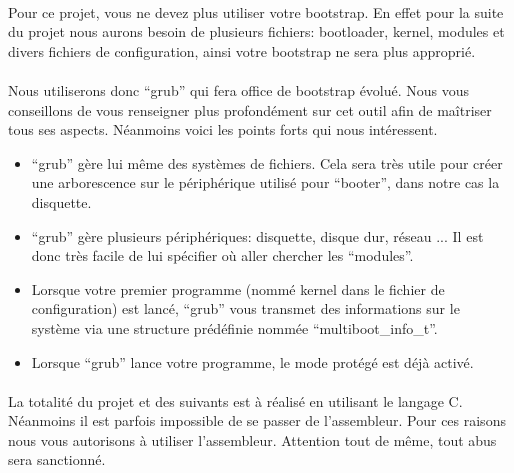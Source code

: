 \documentclass[10pt,a4wide]{article}
\begin{document}
\paragraph{}

Pour ce projet, vous ne devez plus utiliser votre bootstrap. En effet pour
la suite du projet nous aurons besoin de plusieurs fichiers: bootloader,
kernel, modules et divers fichiers de configuration, ainsi votre bootstrap
ne sera plus appropri\'e.

\paragraph{}

Nous utiliserons donc ``grub'' qui fera office de bootstrap \'evolu\'e. Nous
vous conseillons de vous renseigner plus profond\'ement sur cet outil
afin de ma\^itriser tous ses aspects. N\'eanmoins voici les points forts
qui nous int\'eressent.

\begin{itemize}

\item ``grub'' g\`ere lui m\^eme des syst\`emes de fichiers. Cela sera tr\`es
      utile pour cr\'eer une arborescence sur le p\'eriph\'erique utilis\'e
      pour ``booter'', dans notre cas la disquette.
\item ``grub'' g\`ere plusieurs p\'eriph\'eriques: disquette, disque dur,
      r\'eseau ... Il est donc tr\`es facile de lui sp\'ecifier o\`u aller
      chercher les ``modules''.
\item Lorsque votre premier programme (nomm\'e kernel dans le fichier de
      configuration) est lanc\'e, ``grub'' vous transmet des informations
      sur le syst\`eme via une structure pr\'ed\'efinie nomm\'ee
      ``multiboot\_info\_t''.
\item Lorsque ``grub'' lance votre programme, le mode prot\'eg\'e est d\'ej\`a
      activ\'e.

\end{itemize}

\paragraph{}

La totalit\'e du projet et des suivants est \`a r\'ealis\'e en utilisant
le langage C. N\'eanmoins il est parfois impossible de se passer de
l'assembleur. Pour ces raisons nous vous autorisons \`a utiliser l'assembleur.
Attention tout de m\^eme, tout abus sera sanctionn\'e.
\end{document}
